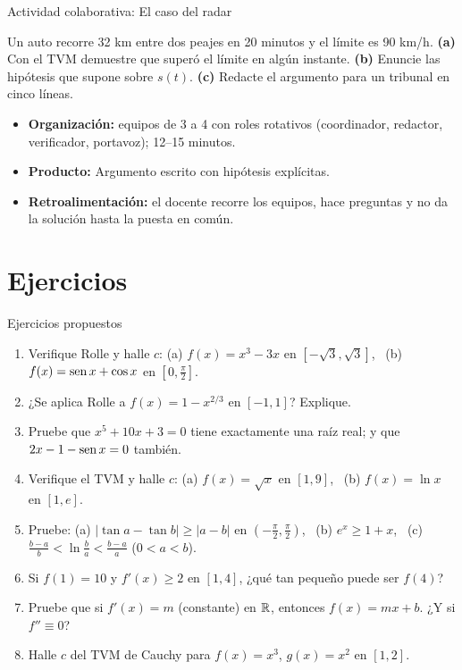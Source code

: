 \documentclass[10pt,aspectratio=169]{beamer}
\begin{document}
\begin{frame}{Actividad colaborativa: El caso del radar}
  \small
  \begin{activa}
    Un auto recorre 32 km entre dos peajes en 20 minutos y el límite es 90 km/h. \textbf{(a)} Con el TVM demuestre que superó el límite en algún instante. \textbf{(b)} Enuncie las hipótesis que supone sobre $s(t)$. \textbf{(c)} Redacte el argumento para un tribunal en cinco líneas.
  \end{activa}
  \begin{itemize}
    \item \textbf{Organización:} equipos de 3 a 4 con roles rotativos (coordinador, redactor, verificador, portavoz); 12--15 minutos.
    \item \textbf{Producto:} Argumento escrito con hipótesis explícitas.
    \item \textbf{Retroalimentación:} el docente recorre los equipos, hace preguntas y no da la solución hasta la puesta en común.
  \end{itemize}
\end{frame}

\section{Ejercicios}

\begin{frame}{Ejercicios propuestos}
  \small
  \begin{ejercicio}
    \begin{enumerate}
      \item Verifique Rolle y halle $c$: (a) $f(x)=x^3-3x$ en $[-\sqrt3,\sqrt3]$, \ (b) $f(x)=\operatorname{sen} x+\cos x$ en $\left[0,\frac\pi2\right]$.
      \item ¿Se aplica Rolle a $f(x)=1-x^{2/3}$ en $[-1,1]$? Explique.
      \item Pruebe que $x^5+10x+3=0$ tiene exactamente una raíz real; y que $2x-1-\operatorname{sen} x=0$ también.
      \item Verifique el TVM y halle $c$: (a) $f(x)=\sqrt x$ en $[1,9]$, \ (b) $f(x)=\ln x$ en $[1,e]$.
      \item Pruebe: (a) $|\tan a-\tan b|\ge|a-b|$ en $\left(-\frac\pi2,\frac\pi2\right)$, \ (b) $e^x\ge1+x$, \ (c) $\frac{b-a}{b}<\ln\frac ba<\frac{b-a}{a}$ ($0<a<b$).
      \item Si $f(1)=10$ y $f'(x)\ge2$ en $[1,4]$, ¿qué tan pequeño puede ser $f(4)$?
      \item Pruebe que si $f'(x)=m$ (constante) en $\mathbb{R}$, entonces $f(x)=mx+b$. ¿Y si $f''\equiv0$?
      \item Halle $c$ del TVM de Cauchy para $f(x)=x^3$, $g(x)=x^2$ en $[1,2]$.
    \end{enumerate}
  \end{ejercicio}
\end{frame}
\end{document}
